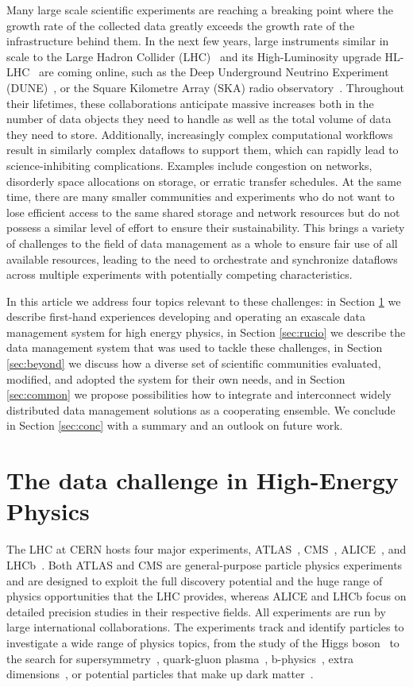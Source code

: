 \documentclass[11pt]{article}
\begin{document}
Many large scale scientific experiments are reaching a breaking point where the growth rate of the collected data greatly exceeds the growth rate of the infrastructure behind them. In the next few years, large instruments similar in scale to the Large Hadron Collider (LHC)~\cite{lhc} and its High-Luminosity upgrade HL-LHC~\cite{hllhc} are coming online, such as the Deep Underground Neutrino Experiment (DUNE)~\cite{dune}, or the Square Kilometre Array (SKA) radio observatory~\cite{ska}. Throughout their lifetimes, these collaborations anticipate massive increases both in the number of data objects they need to handle as well as the total volume of data they need to store. Additionally, increasingly complex computational workflows result in similarly complex dataflows to support them, which can rapidly lead to science-inhibiting complications. Examples include congestion on networks, disorderly space allocations on storage, or erratic transfer schedules. At the same time, there are many smaller communities and experiments who do not want to lose efficient access to the same shared storage and network resources but do not possess a similar level of effort to ensure their sustainability. This brings a variety of challenges to the field of data management as a whole to ensure fair use of all available resources, leading to the need to orchestrate and synchronize dataflows across multiple experiments with potentially competing characteristics.

In this article we address four topics relevant to these challenges: in Section \ref{sec:hep} we describe first-hand experiences developing and operating an exascale data management system for high energy physics, in Section \ref{sec:rucio} we describe the data management system that was used to tackle these challenges, in Section \ref{sec:beyond} we discuss how a diverse set of scientific communities evaluated, modified, and adopted the system for their own needs, and in Section \ref{sec:common} we propose possibilities how to integrate and interconnect widely distributed data management solutions as a cooperating ensemble. We conclude in Section \ref{sec:conc} with a summary and an outlook on future work.

\section{The data challenge in High-Energy Physics}
\label{sec:hep}

The LHC at CERN hosts four major experiments, ATLAS~\cite{atlas}, CMS~\cite{cms}, ALICE~\cite{alice}, and LHCb~\cite{lhcb}. Both ATLAS and CMS are general-purpose particle physics experiments and are designed to exploit the full discovery potential and the huge range of physics opportunities that the LHC provides, whereas ALICE and LHCb focus on detailed precision studies in their respective fields. All experiments are run by large international collaborations. The experiments track and identify particles to investigate a wide range of physics topics, from the study of the Higgs boson~\cite{higgs} to the search for supersymmetry~\cite{susy}, quark-gluon plasma~\cite{plasma}, b-physics~\cite{beauty}, extra dimensions~\cite{extra}, or potential particles that make up dark matter~\cite{darkmatter}.
\end{document}
